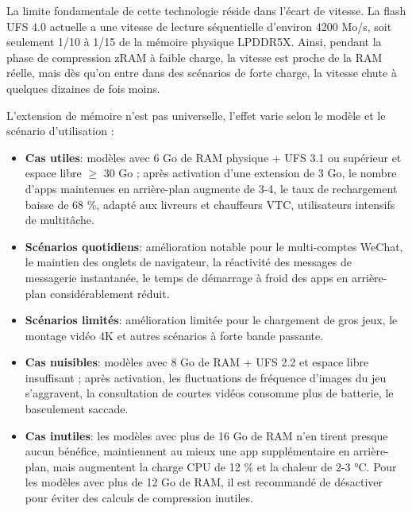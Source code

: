 
La limite fondamentale de cette technologie réside dans l'écart de vitesse. La flash UFS 4.0 actuelle a une vitesse de lecture séquentielle d'environ 4200 Mo/s, soit seulement 1/10 à 1/15 de la mémoire physique LPDDR5X. Ainsi, pendant la phase de compression zRAM à faible charge, la vitesse est proche de la RAM réelle, mais dès qu'on entre dans des scénarios de forte charge, la vitesse chute à quelques dizaines de fois moins.


L'extension de mémoire n'est pas universelle, l'effet varie selon le modèle et le scénario d'utilisation :

\begin{itemize}
  \item \textbf{Cas utiles}: modèles avec 6 Go de RAM physique + UFS 3.1 ou supérieur et espace libre $\geq$ 30 Go ; après activation d'une extension de 3 Go, le nombre d'apps maintenues en arrière-plan augmente de 3-4, le taux de rechargement baisse de 68 \%, adapté aux livreurs et chauffeurs VTC, utilisateurs intensifs de multitâche.
  \item \textbf{Scénarios quotidiens}: amélioration notable pour le multi-comptes WeChat, le maintien des onglets de navigateur, la réactivité des messages de messagerie instantanée, le temps de démarrage à froid des apps en arrière-plan considérablement réduit.
  \item \textbf{Scénarios limités}: amélioration limitée pour le chargement de gros jeux, le montage vidéo 4K et autres scénarios à forte bande passante.
  \item \textbf{Cas nuisibles}: modèles avec 8 Go de RAM + UFS 2.2 et espace libre insuffisant ; après activation, les fluctuations de fréquence d'images du jeu s'aggravent, la consultation de courtes vidéos consomme plus de batterie, le basculement saccade.
  \item \textbf{Cas inutiles}: les modèles avec plus de 16 Go de RAM n'en tirent presque aucun bénéfice, maintiennent au mieux une app supplémentaire en arrière-plan, mais augmentent la charge CPU de 12 \% et la chaleur de 2-3 °C. Pour les modèles avec plus de 12 Go de RAM, il est recommandé de désactiver pour éviter des calculs de compression inutiles.
\end{itemize}


